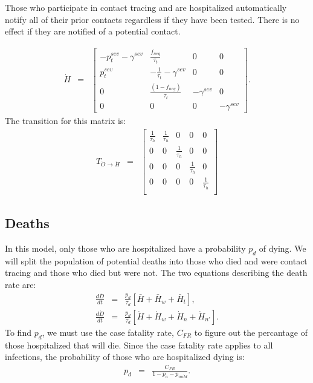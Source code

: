 \documentclass{article}
\begin{document}
Those who participate in contact tracing and are hospitalized automatically notify all of their prior contacts regardless if they have been tested. There is no effect if they are notified of a potential contact.

\begin{eqnarray}
\dot{H} &=&
\begin{bmatrix}
 - p^{sev}_{t} - \gamma^{sev} & \frac{f_{neg}}{\tau_{t}}  & 0 & 0 \\
p^{sev}_{t}  & -\frac{1}{\tau_{t}} - \gamma^{sev}      &  0    & 0  \\
 0 & \frac{(1-f_{neg})}{\tau_{t}}  & - \gamma^{sev}  & 0 \\ 
0 & 0 & 0 & - \gamma^{sev}
\end{bmatrix}.
\end{eqnarray}
The transition for this matrix is:
\begin{eqnarray}
T_{\dot{O} \rightarrow \dot{H}} &=&
\begin{bmatrix}
\frac{1}{\tau_{h}}  & \frac{1}{\tau_{h}} & 0 & 0 & 0 \\ 
0          & 0                 &  \frac{1}{\tau_{h}} & 0 & 0 \\ 
0           & 0                 &  0 & \frac{1}{\tau_{h}} & 0 \\ 
 0       &  0  & 0 & 0 & \frac{1}{\tau_{h}} \\ 
 
\end{bmatrix}
\end{eqnarray}

\subsection{Deaths}
In this model, only those who are hospitalized have a probability $p_{d}$ of dying. We will split the population of potential deaths into those who died and were contact tracing and those who died but were not. The two equations describing the death rate are:
\begin{eqnarray}
\frac{d\bar{D}}{dt} &=& \frac{p_{d}}{\tau_{d}} \left[ \bar{H} + \bar{H}_{w} + \bar{H}_{t}   \right], \\ 
\frac{d\dot{D}}{dt} &=& \frac{p_{d}}{\tau_{d}} \left[ \dot{H} + \dot{H}_{w} + \dot{H}_{n} + \dot{H}_{n'}   \right].
\end{eqnarray}
To find $p_{d}$, we must use the case fatality rate, $C_{FR}$ to figure out the percantage of those hospitalized that will die. Since the case fatality rate applies to all infections, the probability of those who are hospitalized dying is:
\begin{eqnarray}
p_{d} &=& \frac{C_{FR}}{1- p_{a} - p_{mild}}.
\end{eqnarray}
\end{document}
